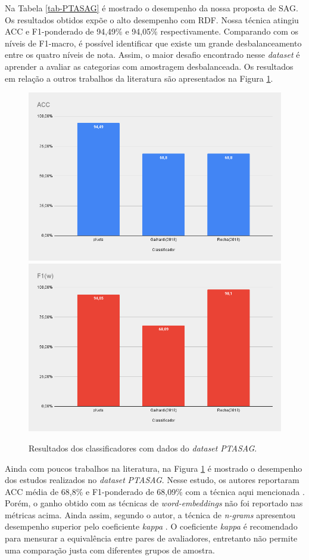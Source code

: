 Na Tabela \ref{tab-PTASAG} é mostrado o desempenho da nossa proposta de SAG. Os resultados obtidos expõe o alto desempenho com RDF. Nossa técnica atingiu ACC e F1-ponderado de 94,49\% e 94,05\% respectivamente. Comparando com os níveis de F1-macro, é possível identificar que existe um grande desbalanceamento entre os quatro níveis de nota. Assim, o maior desafio encontrado nesse \textit{dataset} é aprender a avaliar as categorias com amostragem desbalanceada. Os resultados em relação a outros trabalhos da literatura são apresentados na Figura \ref{fig-PTASAG}.

\begin{figure}[!h]
\centering
\includegraphics[width=.6\textwidth]{figuras/PTASAG/res-ptasag-acc.png}
\includegraphics[width=.6\textwidth]{figuras/PTASAG/res-ptasag-wfs.png}
\caption{Resultados dos classificadores com dados do \textit{dataset} \textit{PTASAG}.}
\label{fig-PTASAG}
\end{figure}

Ainda com poucos trabalhos na literatura, na Figura \ref{fig-PTASAG} é mostrado o desempenho dos estudos realizados no \textit{dataset} \textit{PTASAG}. Nesse estudo, os autores reportaram ACC média de 68,8\% e F1-ponderado de 68,09\% com a técnica aqui mencionada \cite{galhardi2018b}. Porém, o ganho obtido com as técnicas de \textit{word-embeddings} não foi reportado nas métricas acima. Ainda assim, segundo o autor, a técnica de \textit{n-grams} apresentou desempenho superior pelo coeficiente \textit{kappa} \cite{galhardi2020}. O coeficiente \textit{kappa} é recomendado para mensurar a equivalência entre pares de avaliadores, entretanto não permite uma comparação justa com diferentes grupos de amostra.

